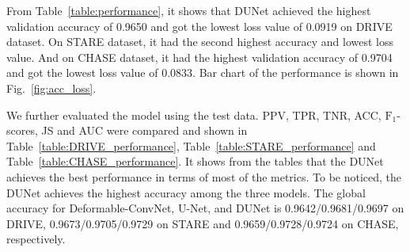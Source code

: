 \documentclass[journal]{IEEEtran}
\begin{document}
From Table~\ref{table:performance}, it shows that DUNet achieved the highest validation accuracy of 0.9650 and got the lowest loss value of 0.0919 on DRIVE dataset. On STARE dataset, it had the second highest accuracy and lowest loss value. And on CHASE dataset, it had the highest validation accuracy of 0.9704 and got the lowest loss value of 0.0833. Bar chart of the performance is shown in Fig.~\ref{fig:acc_loss}.


\begin{figure*}
\centering
{}
\hfil
{}
\hfil
{}
\caption{Performance comparisons using three models using the validation dataset. (a) validation performance on DRIVE; (b) validation performance on STARE; (c) validation performance on CHASE.}
\label{fig:acc_loss}
\end{figure*}


\begin{figure*}
\centering
{}
\hfil
{}
\hfil
{}
\caption{ROC curves of different models. (a) ROC curves on DRIVE; (b) ROC curves on STARE; (c) ROC curves on CHASE.}
\label{fig:roc}
\end{figure*}

We further evaluated the model using the test data. PPV, TPR, TNR, ACC, $\mathrm{F_{1}}$-scores, JS and AUC were compared and shown in Table~\ref{table:DRIVE_performance}, Table~\ref{table:STARE_performance} and Table~\ref{table:CHASE_performance}. It shows from the tables that the DUNet achieves the best performance in terms of most of the metrics. To be noticed, the DUNet achieves the highest accuracy among the three models. The global accuracy for Deformable-ConvNet, U-Net, and DUNet is 0.9642/0.9681/0.9697 on DRIVE, 0.9673/0.9705/0.9729 on STARE and 0.9659/0.9728/0.9724 on CHASE, respectively.
\end{document}
